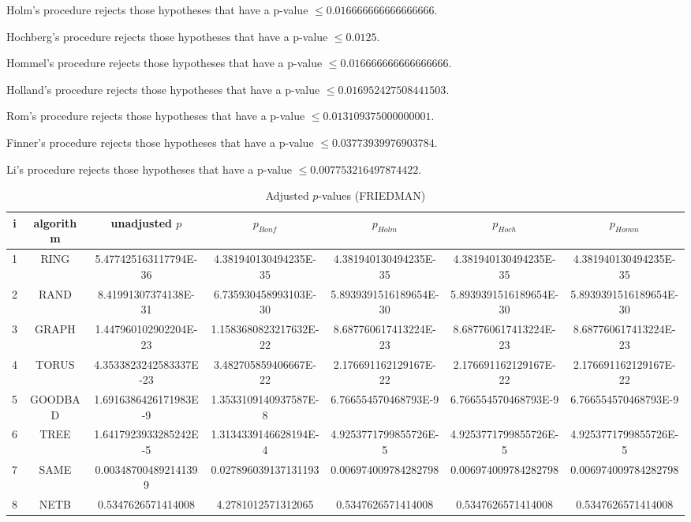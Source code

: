 \documentclass[a4paper,10pt]{article}
\begin{document}
\begin{landscape}
Holm's procedure rejects those hypotheses that have a p-value $\le0.016666666666666666$.


Hochberg's procedure rejects those hypotheses that have a p-value $\le0.0125$.


Hommel's procedure rejects those hypotheses that have a p-value $\le0.016666666666666666$.


Holland's procedure rejects those hypotheses that have a p-value $\le0.016952427508441503$.


Rom's procedure rejects those hypotheses that have a p-value $\le0.013109375000000001$.


Finner's procedure rejects those hypotheses that have a p-value $\le0.03773939976903784$.


Li's procedure rejects those hypotheses that have a p-value $\le0.007753216497874422$.



\newpage

\begin{table}[!htp]
\centering\scriptsize
\caption{Adjusted $p$-values (FRIEDMAN)}
\begin{tabular}{ccccccc}
i&algorithm&unadjusted $p$&$p_{Bonf}$&$p_{Holm}$&$p_{Hoch}$&$p_{Homm}$\\
\hline
1& RING&5.477425163117794E-36&4.381940130494235E-35&4.381940130494235E-35&4.381940130494235E-35&4.381940130494235E-35\\
2& RAND&8.41991307374138E-31&6.735930458993103E-30&5.8939391516189654E-30&5.8939391516189654E-30&5.8939391516189654E-30\\
3& GRAPH&1.447960102902204E-23&1.1583680823217632E-22&8.687760617413224E-23&8.687760617413224E-23&8.687760617413224E-23\\
4& TORUS&4.3533823242583337E-23&3.482705859406667E-22&2.176691162129167E-22&2.176691162129167E-22&2.176691162129167E-22\\
5& GOODBAD&1.6916386426171983E-9&1.3533109140937587E-8&6.766554570468793E-9&6.766554570468793E-9&6.766554570468793E-9\\
6& TREE&1.6417923933285242E-5&1.3134339146628194E-4&4.9253771799855726E-5&4.9253771799855726E-5&4.9253771799855726E-5\\
7& SAME&0.003487004892141399&0.027896039137131193&0.006974009784282798&0.006974009784282798&0.006974009784282798\\
8& NETB&0.5347626571414008&4.2781012571312065&0.5347626571414008&0.5347626571414008&0.5347626571414008\\
\hline
\end{tabular}
\end{table}


\end{landscape}
\end{document}
